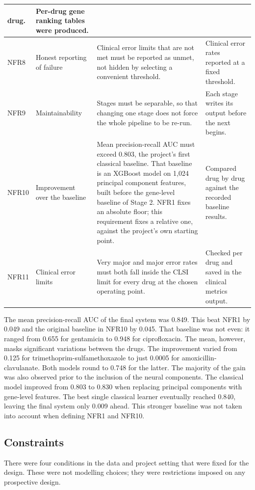 {\begin{longtable}{|l|>{\raggedright\arraybackslash}p{2.7cm}|>{\raggedright\arraybackslash}p{6.0cm}|>{\raggedright\arraybackslash}p{3.6cm}|}
drug. &
Per-drug gene ranking tables were produced. \\
\hline
NFR8 & Honest reporting of failure &
Clinical error limits that are not met must be reported as unmet, not hidden by selecting a
convenient threshold. &
Clinical error rates reported at a fixed threshold. \\
\hline
NFR9 & Maintainability &
Stages must be separable, so that changing one stage does not force the whole pipeline to be
re-run. &
Each stage writes its output before the next begins. \\
\hline
NFR10 & Improvement over the baseline &
Mean precision-recall AUC must exceed 0.803, the project's first classical baseline. That
baseline is an XGBoost model on 1{,}024 principal component features, built before the
gene-level baseline of Stage 2. NFR1 fixes an absolute floor; this requirement fixes a
relative one, against the project's own starting point. &
Compared drug by drug against the recorded baseline results. \\
\hline
NFR11 & Clinical error limits &
Very major and major error rates must both fall inside the CLSI limit for every drug at the
chosen operating point. &
Checked per drug and saved in the clinical metrics output. \\
\end{longtable}}

The mean precision-recall AUC of the final system was 0.849. This beat NFR1 by 0.049 and the
original baseline in NFR10 by 0.045. That baseline was not even: it ranged from 0.655 for
gentamicin to 0.948 for ciprofloxacin. The mean, however, masks significant variations between
the drugs. The improvement varied from 0.125 for trimethoprim-sulfamethoxazole to just 0.0005
for amoxicillin-clavulanate. Both models round to 0.748 for the latter. The majority of the
gain was also observed prior to the inclusion of the neural components. The classical model
improved from 0.803 to 0.830 when replacing principal components with gene-level features. The
best single classical learner eventually reached 0.840, leaving the final system only 0.009
ahead. This stronger baseline was not taken into account when defining NFR1 and NFR10.

\subsection{Constraints}

There were four conditions in the data and project setting that were fixed for the design.
These were not modelling choices; they were restrictions imposed on any prospective design.

